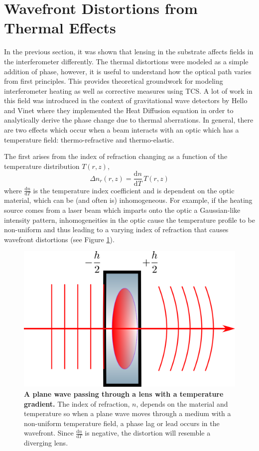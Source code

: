	\section{Wavefront Distortions from Thermal Effects}\label{sec:wf_dist}
	In the previous section, it was shown that lensing in the substrate affects fields in the interferometer differently.  The thermal distortions were modeled as a simple addition of phase, however, it is useful to understand how the optical path varies from first principles.  This provides theoretical groundwork for modeling interferometer heating as well as corrective measures using TCS.  A lot of work in this field was introduced in the context of gravitational wave detectors by Hello and Vinet \cite{hello_vinet} \cite{Vinet_Thermal_Issues} where they implemented the Heat Diffusion equation in order to analytically derive the phase change due to thermal aberrations.  In general, there are two effects which occur when a beam interacts with an optic which has a temperature field: thermo-refractive and thermo-elastic.  
	
	The first arises from the index of refraction changing as a function of the temperature distribution $T(r,z)$,
	\begin{equation}
	\Delta n_{r}(r,z) = \frac{\text{d}n}{\text{d}T} \, T(r,z)
	\end{equation}
	where $\frac{\text{d}n}{\text{d}T}$ is the temperature index coefficient and is dependent on the optic material, which can be (and often is) inhomogeneous.  For example, if the heating source comes from a laser beam which imparts onto the optic a Gaussian-like intensity pattern, inhomogeneities in the optic cause the temperature profile to be non-uniform and thus leading to a varying index of refraction that causes wavefront distortions (see Figure \ref{fig:ThermalLensWF}).
	
	\begin{figure}[ht!]
		\centering
		\includegraphics[width=.4 \textwidth]{../Figures/ThermalLensWF.png}
		\caption[A plane wave passing through a lens with a temperature gradient.]  
		{\textbf{A plane wave passing through a lens with a temperature gradient.} The index of refraction, $n$, depends on the material and temperature so when a plane wave moves through a medium with a non-uniform temperature field, a phase lag or lead occurs in the wavefront. Since $\frac{\text{d}n}{\text{d}T}$ is negative, the distortion will resemble a diverging lens.}
		\label{fig:ThermalLensWF}
	\end{figure}

